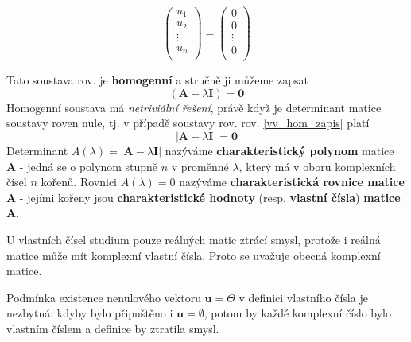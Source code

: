 {\begin{definition}
\begin{equation*}
          \begin{pmatrix}
            u_{1} \\ u_{2} \\ \vdots \\ u_{n} \\
          \end{pmatrix}  =
          \begin{pmatrix}
              0 \\ 0 \\ \vdots \\ 0 \\
            \end{pmatrix}
        \end{equation*}
      \end{definition}

       Tato soustava rov. je \textbf{homogenní} a stručně ji můžeme zapsat
      \begin{equation}\label{vv_hom_zapis}
        \left(\mathbf{A} - \lambda\mathbf{I}\right) = \mathbf{0}
      \end{equation}
      Homogenní soustava má \emph{netriviální řešení}, právě když je determinant matice soustavy 
      roven  nule, tj. v případě soustavy rov. rov. \ref{vv_hom_zapis} platí
      \begin{equation}\label{vv_hom_reseni}
        |\mathbf{A} - \lambda\mathbf{I}| = \mathbf{0}
      \end{equation}
      Determinant \(A(\lambda)=|\mathbf{A} - \lambda \mathbf{I}|\) nazýváme 
      \textbf{charakteristický polynom} matice \(\mathbf{A}\) - jedná se o polynom stupně \(n\) v 
      proměnné \(\lambda\), který má v oboru komplexních čísel \(n\) kořenů. Rovnici 
      \(A(\lambda)=0\) nazýváme \textbf{charakteristická rovnice matice \(\mathbf{A}\)} - jejími 
      kořeny jsou \textbf{charakteristické hodnoty} (resp. \textbf{vlastní čísla}) 
      \textbf{matice} \(\mathbf{A}\).
            
      \begin{note}
        U vlastních čísel studium pouze reálných matic ztrácí smysl, protože i 
        reálná matice může mít komplexní vlastní čísla. Proto se uvažuje obecná komplexní matice.
      \end{note}
      
      \begin{note}
        Podmínka existence nenulového vektoru \(\mathbf{u} = \Theta\) v definici 
        vlastního čísla je nezbytná: kdyby bylo připuštěno i \(\mathbf{u} = \emptyset\), potom by 
        každé komplexní číslo bylo vlastním číslem a definice by ztratila smysl.
      \end{note}
      
}
